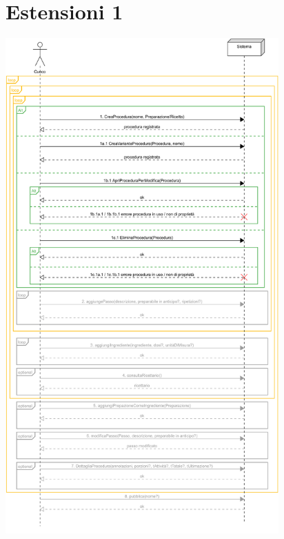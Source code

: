 \section*{Estensioni 1}
\begin{center}
  \includegraphics[max width=\textwidth, max height=190mm]{../resources/img/GRP/SSD/ext1.png}
\end{center}

